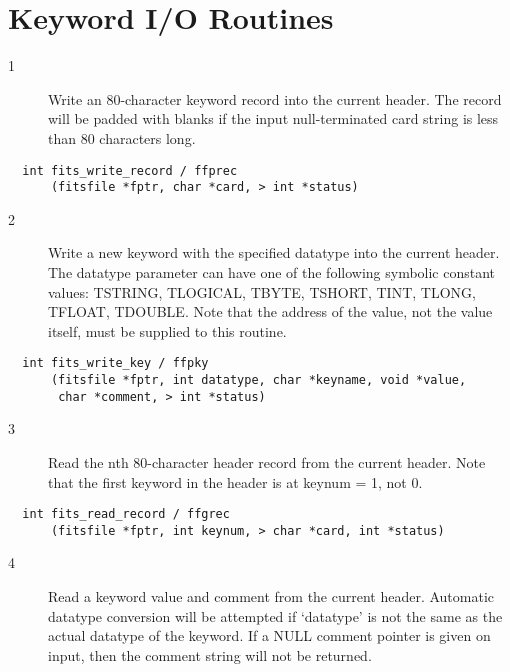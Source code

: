 \section{Keyword I/O Routines}


\begin{description}
\item[1 ]Write an 80-character keyword record into the current header.  The
   record will be padded with blanks if the input null-terminated
  card string is less than 80 characters long.
\end{description}

\begin{verbatim}
  int fits_write_record / ffprec
      (fitsfile *fptr, char *card, > int *status)
\end{verbatim}

\begin{description}
\item[2 ] Write a new keyword with the specified datatype into the current header.
    The datatype parameter can have one of the following symbolic constant
    values: TSTRING, TLOGICAL, TBYTE, TSHORT, TINT, TLONG, TFLOAT, TDOUBLE.
    Note that the address of the value, not the value itself, must be supplied
   to this routine.
\end{description}

\begin{verbatim}
  int fits_write_key / ffpky
      (fitsfile *fptr, int datatype, char *keyname, void *value,
       char *comment, > int *status)
\end{verbatim}

\begin{description}
\item[3 ] Read the nth 80-character header record from the current header.
   Note that the first keyword in the header is at keynum = 1, not 0.
\end{description}

\begin{verbatim}
  int fits_read_record / ffgrec
      (fitsfile *fptr, int keynum, > char *card, int *status)
\end{verbatim}

\begin{description}
\item[4 ] Read a keyword value and comment from the current header.
    Automatic datatype conversion will be attempted if
   `datatype' is not the same as the actual datatype of the keyword.
    If a NULL comment pointer is given on input, then the comment string
   will not be returned.
\end{description}

